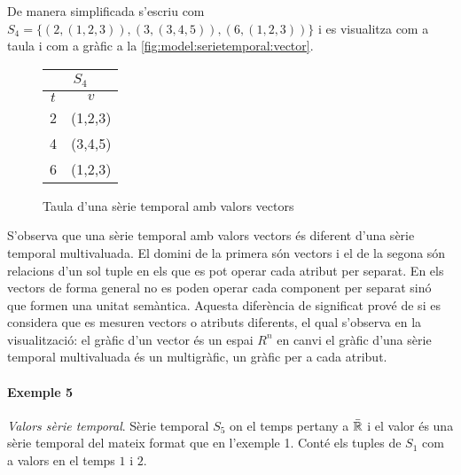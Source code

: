 De manera simplificada s'escriu com $S_4 = \{ (2,(1,2,3)),
(3,(3,4,5)), (6,(1,2,3)) \}$ i es visualitza com a taula i com a
gràfic a la \autoref{fig:model:serietemporal:vector}.

\begin{figure}[tp]
  \centering
  \begin{tabular}{|c|c|}
    \multicolumn{2}{c}{$S_4$} \\ \hline
    $t$  & $v$ \\ \hline
    2  & (1,2,3) \\
    4  & (3,4,5) \\
    6  & (1,2,3) \\ \hline
  \end{tabular} \qquad
    \caption{Taula d'una sèrie temporal amb valors vectors}
  \label{fig:model:serietemporal:vector}
\end{figure}



S'observa que una sèrie temporal amb valors vectors és diferent d'una
sèrie temporal multivaluada. El domini de la primera són vectors i el
de la segona són relacions d'un sol tuple en els que es pot operar
cada atribut per separat. En els vectors de forma general no es poden
operar cada component per separat sinó que formen una unitat
semàntica. Aquesta diferència de significat prové de si es considera
que es mesuren vectors o atributs diferents, el qual s'observa en la
visualització: el gràfic d'un vector és un espai $R^n$ en canvi el
gràfic d'una sèrie temporal multivaluada és un multigràfic, un gràfic
per a cada atribut.





\paragraph{Exemple 5} \emph{Valors sèrie
  temporal}. \label{par:model:exemple-relvalues} Sèrie temporal $S_5$
on el temps pertany a $\bar{\mathbb{R}{}}$ i el valor és una sèrie
temporal del mateix format que en l'exemple 1. Conté els tuples de
$S_1$ com a valors en el temps $1$ i $2$.

